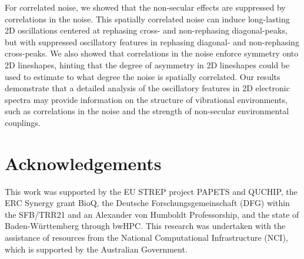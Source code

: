 \documentclass[%
 reprint,%
 amssymb, amsmath,%
 aip,cha,%
]{revtex4-1}
\begin{document}
For correlated noise, we showed that the non-secular effects are suppressed by correlations in the noise.  This spatially correlated noise can induce long-lasting 2D oscillations centered at rephasing cross- and non-rephasing diagonal-peaks, but with suppressed oscillatory features in rephasing diagonal- and non-rephasing cross-peaks.  We also showed that correlations in the noise enforce symmetry onto 2D lineshapes, hinting that the degree of asymmetry in 2D lineshapes could be used to estimate to what degree the noise is spatially correlated.  Our results demonstrate that a detailed analysis of the oscillatory features in 2D electronic spectra may provide information on the structure of vibrational environments, such as correlations in the noise and the strength of non-secular environmental couplings.


\section*{Acknowledgements}
This work was supported by the EU STREP project PAPETS and QUCHIP, the ERC Synergy grant BioQ, the Deutsche Forschungsgemeinschaft (DFG) within the SFB/TRR21 and an Alexander von Humboldt Professorship, and the state of Baden-W{\"u}rttemberg through bwHPC. This research was undertaken with the assistance of resources from the National Computational Infrastructure (NCI), which is supported by the Australian Government.


\appendix
\end{document}
